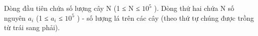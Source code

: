 Dòng đầu tiên chứa số lượng cây N (1 ≤ N ≤ $10^{5}$   ). Dòng thứ hai chứa N số nguyên $a_{i}$   (1 ≤ $a_{i}$   ≤ $10^{5}$   ) - số lượng lá trên các cây (theo thứ tự chúng được trồng từ trái sang phải).